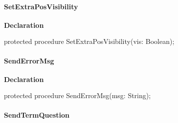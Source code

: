 \documentclass{report}
\newif\ifpdf
\begin{document}
\paragraph*{SetExtraPosVisibility}\hspace*{\fill}

\label{ipkhandle.TInstallation-SetExtraPosVisibility}
\begin{list}{}{
\setlength{\itemindent}{0cm}
\setlength{\listparindent}{0cm}
\setlength{\leftmargin}{\evensidemargin}
\addtolength{\leftmargin}{\tmplength}
\settowidth{\labelsep}{X}
\addtolength{\leftmargin}{\labelsep}
\setlength{\labelwidth}{\tmplength}
}
\item[\textbf{Declaration}\hfill]
\ifpdf
\begin{flushleft}
\fi
\begin{ttfamily}
protected procedure SetExtraPosVisibility(vis: Boolean);\end{ttfamily}

\ifpdf
\end{flushleft}
\fi

\end{list}
\paragraph*{SendErrorMsg}\hspace*{\fill}

\label{ipkhandle.TInstallation-SendErrorMsg}
\begin{list}{}{
\setlength{\itemindent}{0cm}
\setlength{\listparindent}{0cm}
\setlength{\leftmargin}{\evensidemargin}
\addtolength{\leftmargin}{\tmplength}
\settowidth{\labelsep}{X}
\addtolength{\leftmargin}{\labelsep}
\setlength{\labelwidth}{\tmplength}
}
\item[\textbf{Declaration}\hfill]
\ifpdf
\begin{flushleft}
\fi
\begin{ttfamily}
protected procedure SendErrorMsg(msg: String);\end{ttfamily}

\ifpdf
\end{flushleft}
\fi

\end{list}
\paragraph*{SendTermQuestion}\hspace*{\fill}
\end{document}
